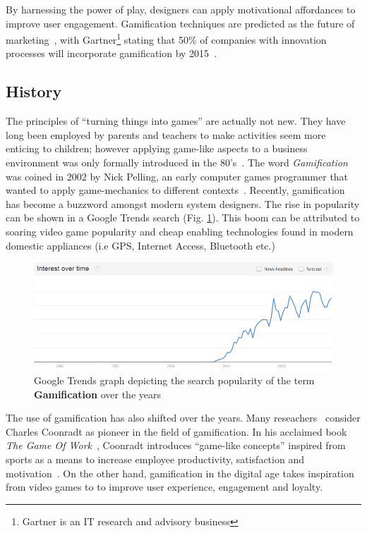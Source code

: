 By harnessing the power of play, designers can apply motivational affordances to improve user engagement. Gamification techniques are predicted as the future of marketing~\cite{ventata}, with Gartner\footnote{Gartner is an IT research and advisory business} stating that 50\% of companies with innovation processes will incorporate gamification by 2015~\cite{gartner50}.

\subsection{History}
The principles of ``turning things into games'' are actually not new. They have long been employed by parents and teachers to make activities seem more enticing to children; however applying game-like aspects to a business environment was only formally introduced in the 80's~\cite{coonradt1985game}. The word \emph{Gamification} was coined in 2002 by Nick Pelling, an early computer games programmer that wanted to apply game-mechanics to different contexts~\cite{marczewskigamification}. Recently, gamification has become a buzzword amongst modern system designers. The rise in popularity can be shown in a Google Trends search (Fig. \ref{fig:gamificationpopularity}). This boom can be attributed to soaring video game popularity and cheap enabling technologies found in modern domestic appliances (i.e GPS, Internet Access, Bluetooth etc.)~\cite{Deterding:2012:GDM:2212877.2212883}

\begin{figure}[H]
  \centering
    \includegraphics[width=1\textwidth]{img/gamification.png}
      \caption{Google Trends graph depicting the search popularity of the term \textbf{Gamification} over the years}
      \label{fig:gamificationpopularity}
\end{figure}


The use of gamification has also shifted over the years. Many reseachers~\cite{deterding2014ambiguity}\cite{park2014study} consider Charles Coonradt as pioneer in the field of gamification. In his acclaimed book \emph{The Game Of Work}~\cite{coonradt1985game}, Coonradt introduces ``game-like concepts'' inspired from sports as a means to increase employee productivity, satisfaction and motivation~\cite{coonradt1985game}. On the other hand, gamification in the digital age takes inspiration from video games to to improve user experience, engagement and loyalty.~\cite{ventata}

